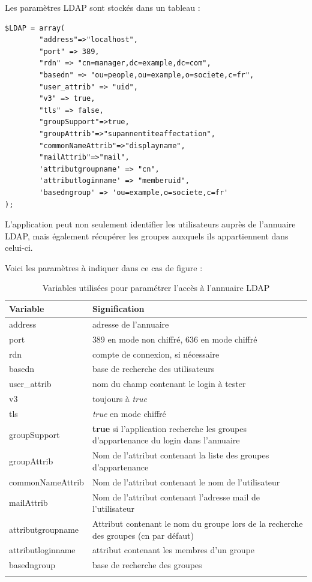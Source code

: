 Les paramètres LDAP sont stockés dans un tableau :
\begin{lstlisting}
$LDAP = array(
		"address"=>"localhost",
		"port" => 389,
		"rdn" => "cn=manager,dc=example,dc=com",
		"basedn" => "ou=people,ou=example,o=societe,c=fr",
		"user_attrib" => "uid",
		"v3" => true,
		"tls" => false,
		"groupSupport"=>true,
		"groupAttrib"=>"supannentiteaffectation",
		"commonNameAttrib"=>"displayname",
		"mailAttrib"=>"mail",
		'attributgroupname' => "cn",
		'attributloginname' => "memberuid",
		'basedngroup' => 'ou=example,o=societe,c=fr'
);
\end{lstlisting}


L'application peut non seulement identifier les utilisateurs auprès de l'annuaire LDAP, mais également récupérer les groupes auxquels ils appartiennent dans celui-ci.

Voici les paramètres à indiquer dans ce cas de figure : 
\begin{longtable}{|p{5cm}|p{10cm}|}
\hline
\textbf{Variable} & \textbf{Signification} \\
\hline
\endhead
address &  adresse de l'annuaire\\
\hline
port & 389 en mode non chiffré, 636 en mode chiffré\\
\hline
rdn & compte de connexion, si nécessaire \\
\hline
basedn & base de recherche des utilisateurs\\
\hline
user\_attrib & nom du champ contenant le login à tester\\
\hline
v3 & toujours à \textit{true}\\
\hline
tls & \textit{true} en mode chiffré\\
\hline
groupSupport & \textbf{true} si l'application recherche les groupes d'appartenance du login dans l'annuaire\\
\hline
groupAttrib & Nom de l'attribut contenant la liste des groupes d'appartenance\\
\hline
commonNameAttrib & Nom de l'attribut contenant le nom de l'utilisateur\\
\hline
mailAttrib & Nom de l'attribut contenant l'adresse mail de l'utilisateur\\
\hline
attributgroupname & Attribut contenant le nom du groupe lors de la recherche des groupes (cn par défaut)\\
\hline
attributloginname & attribut contenant les membres d'un groupe\\
\hline
basedngroup & base de recherche des groupes \\
\hline
\caption{Variables utilisées pour paramétrer l'accès à l'annuaire LDAP}
\end{longtable}

